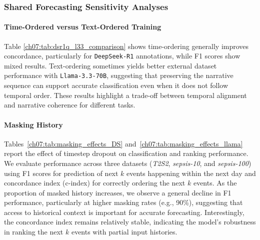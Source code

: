 \subsubsection{Shared Forecasting Sensitivity Analyses}\label{ch07:sec:shared-sensitivity-results}
\ChSevenHeadingOnly

\paragraph{Time-Ordered versus Text-Ordered Training}\label{ch07:apd:sensitivity_analyses}

{\raggedright
Table \ref{ch07:tab:dsr1q_l33_comparison} shows time-ordering generally improves concordance, particularly for \texttt{DeepSeek-R1} annotations, while F1 scores show mixed results. Text-ordering sometimes yields better external dataset performance with \texttt{Llama-3.3-70B}, suggesting that preserving the narrative sequence can support accurate classification even when it does not follow temporal order.  These results highlight a trade-off between temporal alignment and narrative coherence for different tasks.


\par}


\paragraph{Masking History}\label{ch07:apd:masking_l33_dsr1}

Tables~\ref{ch07:tab:masking_effects_DS} and~\ref{ch07:tab:masking_effects_llama} report the effect of timestep dropout on classification and ranking performance.
We evaluate performance across three datasets (\textit{T2S2}, \textit{sepsis-10}, and \textit{sepsis-100}) using F1 scores for prediction of next \(k\) events happening within the next day and concordance index (c-index) for correctly ordering the next \(k\) events.
As the proportion of masked history increases, we observe a general decline in F1 performance, particularly at higher masking rates (e.g., 90\%), suggesting that access to historical context is important for accurate forecasting.
Interestingly, the concordance index remains relatively stable, indicating the model's robustness in ranking the next \(k\) events with partial input histories.

